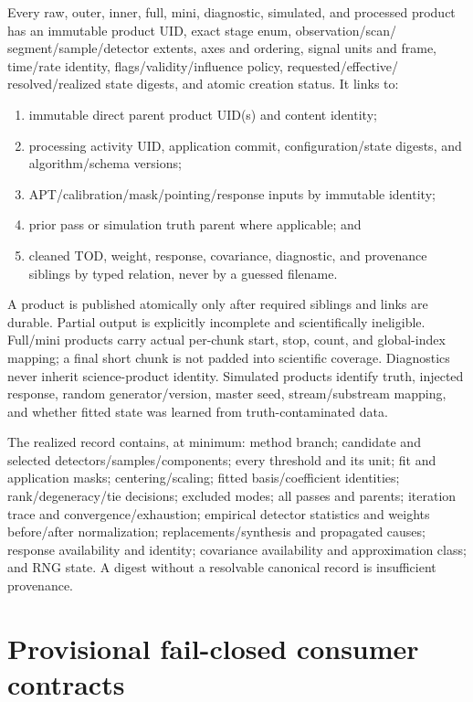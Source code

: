 \documentclass[11pt]{article}
\begin{document}
Every raw, outer, inner, full, mini, diagnostic, simulated, and processed
product has an immutable product UID, exact stage enum, observation/scan/
segment/sample/detector extents, axes and ordering, signal units and frame,
time/rate identity, flags/validity/influence policy, requested/effective/
resolved/realized state digests, and atomic creation status.  It links to:
\begin{enumerate}[leftmargin=*]
  \item immutable direct parent product UID(s) and content identity;
  \item processing activity UID, application commit, configuration/state
  digests, and algorithm/schema versions;
  \item APT/calibration/mask/pointing/response inputs by immutable identity;
  \item prior pass or simulation truth parent where applicable; and
  \item cleaned TOD, weight, response, covariance, diagnostic, and provenance
  siblings by typed relation, never by a guessed filename.
\end{enumerate}

A product is published atomically only after required siblings and links are
durable.  Partial output is explicitly incomplete and scientifically
ineligible.  Full/mini products carry actual per-chunk start, stop, count, and
global-index mapping; a final short chunk is not padded into scientific
coverage.  Diagnostics never inherit science-product identity.  Simulated
products identify truth, injected response, random generator/version, master
seed, stream/substream mapping, and whether fitted state was learned from
truth-contaminated data.

The realized record contains, at minimum: method branch; candidate and
selected detectors/samples/components; every threshold and its unit; fit and
application masks; centering/scaling; fitted basis/coefficient identities;
rank/degeneracy/tie decisions; excluded modes; all passes and parents;
iteration trace and convergence/exhaustion; empirical detector statistics and
weights before/after normalization; replacements/synthesis and propagated
causes; response availability and identity; covariance availability and
approximation class; and RNG state.  A digest without a resolvable canonical
record is insufficient provenance.

\section{Provisional fail-closed consumer contracts}
\label{sec:consumers}
\end{document}
